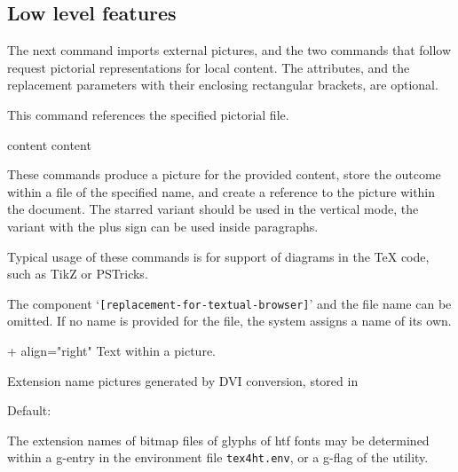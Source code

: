 \subsection{Low level features}

The next command imports external pictures, and the two commands that follow
request pictorial representations for local content. The attributes, and the
replacement parameters with their enclosing rectangular brackets, are optional. 


This command references the specified pictorial file. 

\begin{texsource}
\end{texsource}

 content 
 content 

These commands produce a picture for the provided content, store the outcome
within a file of the specified name, and create a reference to the picture
within the document. The starred variant should be used in the vertical mode, the variant with the plus sign
can be used inside paragraphs.

Typical usage of these commands is for support of diagrams in the \TeX{} code, such as TikZ or PSTricks.

The component ‘\texttt{[replacement-for-textual-browser]}’ and the file name can be
omitted. If no name is provided for the file, the system assigns a name of its
own.

\begin{texsource}
\Picture+{ align="right"}%
Text within a picture.
\EndPicture
\end{texsource}


 {Extension name pictures generated by DVI conversion, stored in }\EndDoc

Default: 

\begin{texsource}
\end{texsource}

  The extension names of bitmap files of glyphs of htf fonts may be
  determined within a g-entry in the environment file \texttt{tex4ht.env}, or a
  g-flag of the  utility.

